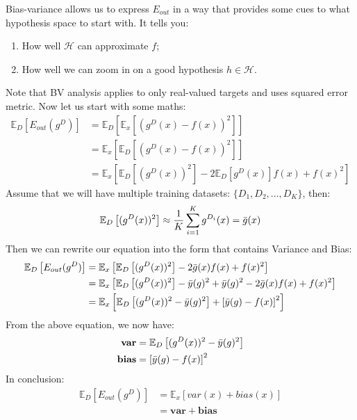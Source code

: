 \documentclass{article}
\begin{document}
Bias-variance allows us to express $E_{out}$ in a way that provides some cues to what hypothesis space to start with. It tells you:
\begin{enumerate}
    \item How well $\mathcal{H}$ can approximate $f$;
    \item How well we can zoom in on a good hypothesis $h \in \mathcal{H}$.
\end{enumerate}
Note that BV analysis applies to only real-valued targets and uses squared error metric. Now let us start with some maths:
\begin{align*}
    \mathbb{E}_{D}\left[ E_{out}(g^{D}) \right]
    &= \mathbb{E}_{D} \left[ \mathbb{E}_{x} \left[  (g^{D}(x) - f(x))^{2} \right]  \right]\\
    &= \mathbb{E}_{x} \left[ \mathbb{E}_{D} \left[  (g^{D}(x) - f(x))^{2} \right]  \right]\\
    &= \mathbb{E}_{x} \left[ \mathbb{E}_{D} \left[  (g^{D}(x))^{2} \right] -2\mathbb{E}_{D}[g^{D}(x)]f(x) + f(x)^{2} \right]
\end{align*}
Assume that we will have multiple training datasets: $\{ D_1, D_2, ..., D_K \}$, then:
\begin{align*}
    \mathbb{E}_{D} \left[  (g^{D}(x))^{2} \right] \approx \frac{1}{K} \sum_{i=1}^{K} g^{D_{i}}(x) = \Bar{g}(x)
\end{align*}
Then we can rewrite our equation into the form that contains Variance and Bias:
\begin{align*}
    \mathbb{E}_{D}\left[ E_{out}(g^{D}) \right]
    &= \mathbb{E}_{x} \left[ \mathbb{E}_{D} \left[  (g^{D}(x))^{2} \right] -2\Bar{g}(x)f(x) + f(x)^{2} \right]\\
    &= \mathbb{E}_{x} \left[ \mathbb{E}_{D} \left[  (g^{D}(x))^{2} \right]-\Bar{y}(g)^{2}+\Bar{y}(g)^{2} -2\Bar{g}(x)f(x) + f(x)^{2} \right]\\
    &= \mathbb{E}_{x} \left[ \mathbb{E}_{D} \left[  (g^{D}(x))^{2} -\Bar{y}(g)^{2}\right]+\left[  \Bar{y}(g) - f(x)\right]^{2} \right]
\end{align*}
From the above equation, we now have:
\begin{align*}
    \textbf{var} &= \mathbb{E}_{D} \left[  (g^{D}(x))^{2} -\Bar{y}(g)^{2}\right]\\
    \textbf{bias} &= \left[  \Bar{y}(g) - f(x)\right]^{2}
\end{align*}
In conclusion:
\begin{align*}
     \mathbb{E}_{D}\left[ E_{out}(g^{D}) \right]
     &= \mathbb{E}_{x}\left[ var(x) +bias(x) \right]\\
     &= \textbf{var} + \textbf{bias}
\end{align*}
\end{document}
